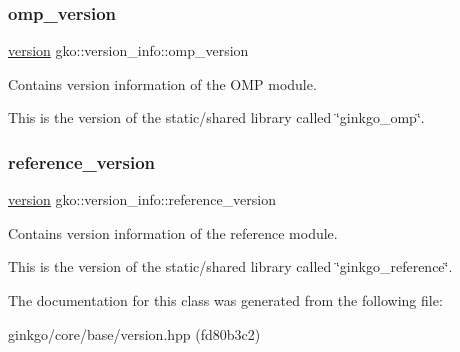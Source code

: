 \subsubsection{\texorpdfstring{omp\+\_\+version}{omp\_version}}
{\footnotesize\ttfamily \hyperlink{structgko_1_1version}{version} gko\+::version\+\_\+info\+::omp\+\_\+version}



Contains version information of the O\+MP module. 

This is the version of the static/shared library called \char`\"{}ginkgo\+\_\+omp\char`\"{}. \mbox{\label{classgko_1_1version__info_a772fcf25f93d719b733602b4bba7d7ec}} 
\subsubsection{\texorpdfstring{reference\+\_\+version}{reference\_version}}
{\footnotesize\ttfamily \hyperlink{structgko_1_1version}{version} gko\+::version\+\_\+info\+::reference\+\_\+version}



Contains version information of the reference module. 

This is the version of the static/shared library called \char`\"{}ginkgo\+\_\+reference\char`\"{}. 

The documentation for this class was generated from the following file\+:\begin{DoxyCompactItemize}
\item 
ginkgo/core/base/version.\+hpp (fd80b3c2)\end{DoxyCompactItemize}
